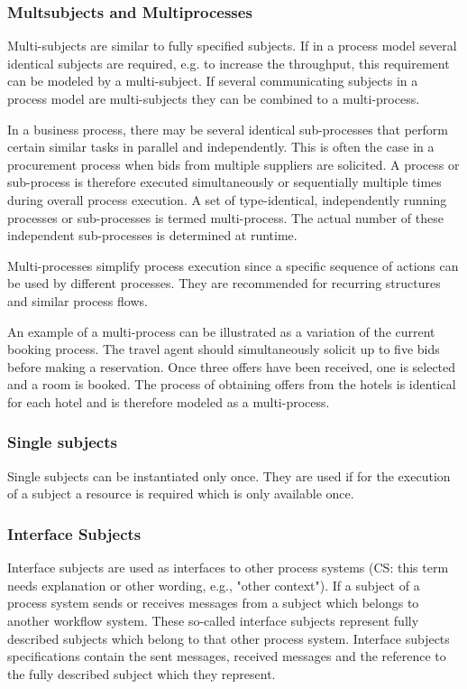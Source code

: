 \subsubsection{Multsubjects and Multiprocesses}

Multi-subjects are similar to fully specified subjects. If in a process model several identical subjects are required, e.g. to increase the throughput, this requirement can be modeled by a multi-subject. If several communicating subjects in a process model are multi-subjects they can be combined to a multi-process.

In a business process, there may be several identical sub-processes that perform certain similar tasks in parallel and independently. This is often the case in a procurement process when bids from multiple suppliers are solicited. A process or sub-process is therefore executed simultaneously or sequentially multiple times during overall process execution. A set of type-identical, independently running processes or sub-processes is termed multi-process. The actual number of these independent sub-processes is determined at runtime.

Multi-processes simplify process execution since a specific sequence of actions can be used by different processes. They are recommended for recurring structures and similar process flows. 

An example of a multi-process can be illustrated as a variation of the current booking process. The travel agent should simultaneously solicit up to five bids before making a reservation. Once three offers have been received, one is selected and a room is booked. The process of obtaining offers from the hotels is identical for each hotel and is therefore modeled as a multi-process.

\subsubsection{Single subjects}

Single subjects can be instantiated only once. They are used if for the execution of a subject a resource is required which is only available once.

\subsubsection{Interface Subjects}

Interface subjects are used as interfaces to other process systems (CS: this term needs explanation or other wording, e.g., "other context"). If a subject of a process system sends or receives messages from a subject which belongs to another workflow system. These so-called interface subjects represent fully described subjects which belong to that other process system. Interface subjects specifications contain the sent messages, received messages and the reference to the fully described subject which they represent.

